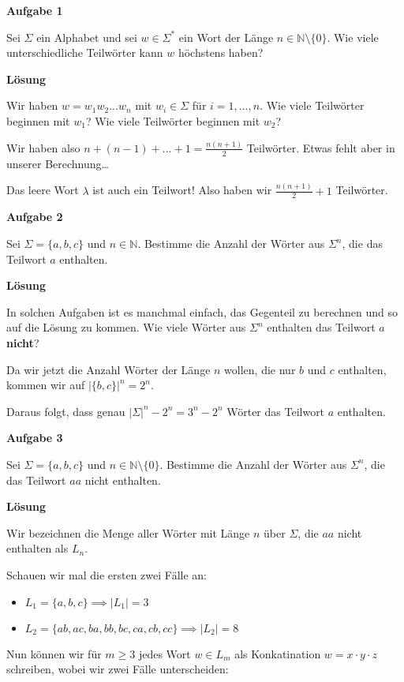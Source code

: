 \documentclass[a4paper, 11pt]{article}
\def\N{\mathbb{N}}
\newcommand\myTitle[1]{{\large \textbf {#1}}}
\begin{document}
    \myTitle{Aufgabe 1}

	Sei $\Sigma$ ein Alphabet und sei $w \in \Sigma^*$ ein Wort der Länge $n \in \N \setminus \{0\}$. Wie viele unterschiedliche Teilwörter kann $w$ höchstens haben?

	\myTitle{Lösung}

	Wir haben $w = w_1w_2...w_n$ mit $w_i \in \Sigma$ für $i = 1, ...,n$. Wie viele Teilwörter beginnen mit $w_1$? Wie viele Teilwörter beginnen mit $w_2$?
	 
	
	Wir haben also $n + (n-1) + ... + 1 = \frac{n(n+1)}{2}$ Teilwörter. Etwas fehlt aber in unserer Berechnung\dots
	
	
	Das leere Wort $\lambda$ ist auch ein Teilwort! Also haben wir $\frac{n(n+1)}{2}+ 1$ Teilwörter. 

    \vspace*{1cm}
    \myTitle{Aufgabe 2}

	Sei $\Sigma = \{a, b, c\}$ und $n \in \N$. Bestimme die Anzahl der Wörter aus $\Sigma^n$, die das Teilwort $a$ enthalten.
	
    \myTitle{Lösung}
    
	In solchen Aufgaben ist es manchmal einfach, das Gegenteil zu berechnen und so auf die Lösung zu kommen. Wie viele Wörter aus $\Sigma^n$ enthalten das Teilwort $a$ \textbf{nicht}?

	
	Da wir jetzt die Anzahl Wörter der Länge $n$ wollen, die nur $b$ und $c$ enthalten, kommen wir auf $|\{b,c\}|^n = 2^n$.
	
	Daraus folgt, dass genau $|\Sigma|^n - 2^n = 3^n -2^n$ Wörter das Teilwort $a$ enthalten.
    \vspace*{1cm}

    \myTitle{Aufgabe 3}

	Sei $\Sigma= \{a,b,c\}$ und $n \in \N \setminus\{0\}$. Bestimme die Anzahl der Wörter aus $\Sigma^n$, die das Teilwort $aa$ nicht enthalten.

	\myTitle{Lösung}

	Wir bezeichnen die Menge aller Wörter mit Länge $n$ über $\Sigma$, die $aa$ nicht enthalten als $L_n$.

	Schauen wir mal die ersten zwei Fälle an:
	\begin{itemize}
		\item $L_1 = \{a,b,c\} \implies |L_1| = 3$
		\item $L_2 = \{ab, ac, ba, bb, bc, ca, cb, cc\} \implies |L_2| = 8$ 
	\end{itemize}
	
	Nun können wir für $m \geq 3$ jedes Wort $w \in L_m$ als Konkatination $w = x \cdot y \cdot z$ schreiben, wobei wir zwei Fälle unterscheiden:
	
\end{document}
